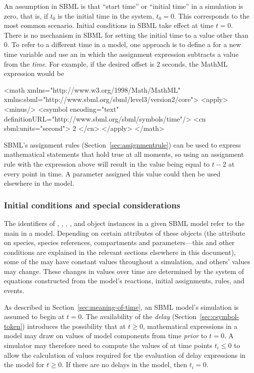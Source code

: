 An assumption in SBML is that ``start time'' or ``initial time''
in a simulation is zero, that is, if $t_0$ is the initial time in
the system, $t_0 = 0$.  This corresponds to the most common
scenario.  Initial conditions in SBML take effect at time $t = 0$.
There is no mechanism in SBML for setting the initial time to a
value other than 0.  To refer to a different time in a model, one
approach is to define a \Parameter for a new time variable and use
an \AssignmentRule in which the assignment expression subtracts a
value from the  \emph{time}.  For example, if the
desired offset is 2 seconds, the MathML expression would be

\begin{example}
<math xmlns="http://www.w3.org/1998/Math/MathML"
      xmlns:sbml="http://www.sbml.org/sbml/level3/version2/core">
    <apply>
        <minus/>
        <csymbol encoding="text" definitionURL="http://www.sbml.org/sbml/symbols/time"/> 
        <cn sbml:units="second"> 2 </cn>
    </apply>
</math>
\end{example}

SBML's assignment rules (Section~\ref{sec:assignmentrule}) can be
used to express mathematical statements that hold true at all
moments, so using an assignment rule with the expression above
will result in the value being equal to $t - 2$ at every point in
time.  A parameter assigned this value could then be used
elsewhere in the model.


\subsubsection{Initial conditions and special considerations}
\label{sec:before-t0}

The identifiers of \Species, \SpeciesReference, \Compartment, \Parameter, and
\Reaction object instances in a given SBML model refer to the main
 in a model.  Depending on certain attributes of these
objects (\eg the attribute  on species, species references, compartments
and parameters---this and other conditions are explained in the
relevant sections elsewhere in this document), some of the
 may have constant values throughout a simulation, and
others' values may change.  These changes in values over time are
determined by the system of equations constructed from the model's
reactions, initial assignments, rules, and events.

As described in Section~\ref{sec:meaning-of-time}, an SBML model's
simulation is assumed to begin at $t = 0$.  The availability of
the \emph{delay}  (Section~\ref{sec:csymbol-token})
introduces the possibility that at $t \geq 0$, mathematical
expressions in a model may draw on values of model components from
time \emph{prior} to $t = 0$.  A simulator may therefore need to
compute the values of  at time points $t_i \leq 0$ to
allow the calculation of values required for the evaluation of
delay expressions in the model for $t \geq 0$.  If there are no
delays in the model, then $t_i = 0$.

